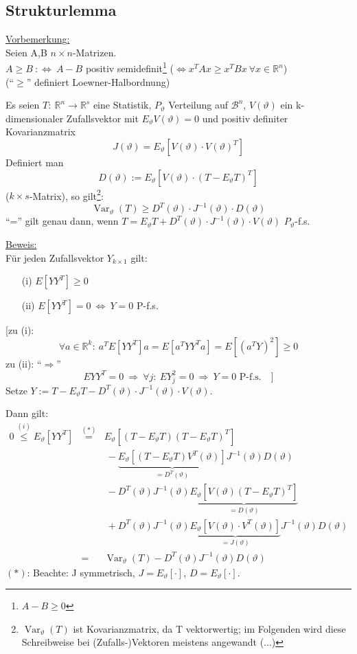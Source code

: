 \documentclass[a4paper,11pt,twoside,titlepage]{article}
\newcommand{\R}{{\mathbb R}}
\newcommand\BB{ \mathcal{B} } %
\DeclareMathOperator{\var}{Var}
\begin{document}
\subsection{Strukturlemma}
\underline{Vorbemerkung:}\\
Seien A,B $n\times n$-Matrizen.\\
$A\geq B\ :\Leftrightarrow\ A-B$ positiv semidefinit\footnote{$A-B\geq0$} ($\Leftrightarrow x^TAx\geq x^TBx\ \forall x\in\R^n$)\\
("`$\geq$"' definiert Loewner-Halbordnung)

Es seien $T:\ \R^n\to\R^s$ eine Statistik, $P_\vartheta$ Verteilung auf $\BB^n$, $V(\vartheta)$ ein k-dimensionaler Zufallsvektor mit $E_\vartheta V(\vartheta)=0$ und positiv definiter Kovarianzmatrix 
\[J(\vartheta)=E_\vartheta[V(\vartheta)\cdot V(\vartheta)^T]\]
Definiert man
\[D(\vartheta):=E_\vartheta[V(\vartheta)\cdot(T-E_\vartheta T)^T]\]
($k\times s$-Matrix), so gilt\footnote{$\var_\vartheta(T)$ ist Kovarianzmatrix, da T vektorwertig; im Folgenden wird diese Schreibweise bei (Zufalls-)Vektoren meistens angewandt (...)}:
\[\var_\vartheta(T)\geq D^T(\vartheta)\cdot J^{-1}(\vartheta)\cdot D(\vartheta)\]
"`="' gilt genau dann, wenn $T=E_\vartheta T+D^T(\vartheta)\cdot J^{-1}(\vartheta)\cdot V(\vartheta)$ $P_\vartheta$-f.s.

\underline{Beweis:}\\
Für jeden Zufallsvektor $Y_{k\times 1}$ gilt:
\begin{itemize}
\item[(i)] $E[YY^T]\geq0$
\item[(ii)] $E[YY^T]=0\ \Leftrightarrow\ Y=0$ P-f.s.
\end{itemize}
[zu (i): 
\[\forall a\in\R^k:\ a^TE[YY^T]a=E[a^TYY^Ta]=E[(a^TY)^2]\geq0\]
zu (ii): "`$\Rightarrow$"'
\[EYY^T=0\ \Rightarrow\ \forall j:\ EY_j^2=0\ \Rightarrow\ Y=0\mbox{ P-f.s.}\quad]\]
Setze $Y:=T-E_\vartheta T-D^T(\vartheta)\cdot J^{-1}(\vartheta)\cdot V(\vartheta)$.

Dann gilt:
\begin{eqnarray*}
0\stackrel{(i)}{\leq} E_\vartheta[YY^T]&\stackrel{(\ast)}{=}&E_\vartheta[(T-E_\vartheta T)(T-E_\vartheta T)^T]\\
&&\ -\underbrace{E_\vartheta[(T-E_\vartheta T)V^T(\vartheta)]}_{=D^T(\vartheta)}J^{-1}(\vartheta)D(\vartheta)\\
&&\ -D^T(\vartheta)J^{-1}(\vartheta)\underbrace{E_\vartheta[V(\vartheta)(T-E_\vartheta T)^T]}_{=D(\vartheta)}\\
&&\ +D^T(\vartheta)J^{-1}(\vartheta)\underbrace{E_\vartheta[V(\vartheta)\cdot V^T(\vartheta)]}_{=J(\vartheta)}J^{-1}(\vartheta)D(\vartheta)\\
&=&\var_\vartheta(T)-D^T(\vartheta)J^{-1}(\vartheta)D(\vartheta) \end{eqnarray*}
$(\ast)$: Beachte: J symmetrisch, $J=E_\vartheta[\cdot]$, $D=E_\vartheta[\cdot]$.\newline
[$Y=(T-E_\vartheta T)-(D^T(\vartheta)\cdot J^{-1}(\vartheta)\cdot V(\vartheta))$]
\end{document}
